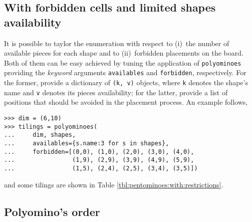 \subsection*{With forbidden cells and limited shapes availability}

It is possible to taylor the enumeration with respect to (i)~the number of
available pieces for each shape and to (ii)~forbidden placements on the board.
Both of them can be easy achieved by tuning the application of \verb|polyominoes|
providing the \textit{keyword} arguments \verb|availables| and
\verb|forbidden|, respectively. For the former, provide a dictionary of
\verb|(k, v)| objects, where \verb|k| denotes the shape's name and \verb|v|
denotes its pieces availability; for the latter, provide a list of
positions that should be avoided in the placement process. An example follows,
\begin{verbatim}
>>> dim = (6,10)
>>> tilings = polyominoes(
...     dim, shapes,
...     availables={s.name:3 for s in shapes},
...     forbidden=[(0,0), (1,0), (2,0), (3,0), (4,0),
...                (1,9), (2,9), (3,9), (4,9), (5,9),
...                (1,5), (2,4), (2,5), (3,4), (3,5)])
\end{verbatim}
and some tilings are shown in Table \ref{tbl:pentominoes:with:restrictions}.

\vfill
\subsection{Polyomino's order}

